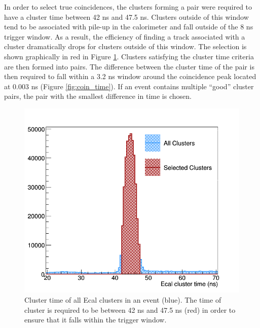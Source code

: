 In order to select true coincidences, the clusters forming a pair were 
required to have a cluster time between 42 ns and 47.5 ns.  Clusters outside 
of this window tend to be associated with pile-up in the calorimeter 
and fall outside of the 8 ns trigger window.  As a result, the efficiency of
finding a track associated with a cluster dramatically drops for clusters 
outside of this window. The selection is
shown graphically in red in Figure \ref{fig:cluster_times}.  Clusters satisfying
the cluster time criteria are then formed into pairs.  The difference between the
cluster time of the pair is then required to fall within a 3.2 ns window around the 
coincidence peak located at 0.003 ns (Figure \ref{fig:coin_time}).  If an event
contains multiple ``good'' cluster pairs, the pair with the smallest difference 
in time is chosen. 
\begin{figure}[ht]
    \centering
    \includegraphics[width=.9\textwidth]{images/20160428_ecal_cluster_time.png}
    \caption{Cluster time of all Ecal clusters in an event (blue). The time of 
             cluster is required to be between 42 ns and 47.5 ns (red) in order to 
             ensure that it falls within the trigger window.}
    \label{fig:cluster_times}
\end{figure}  

